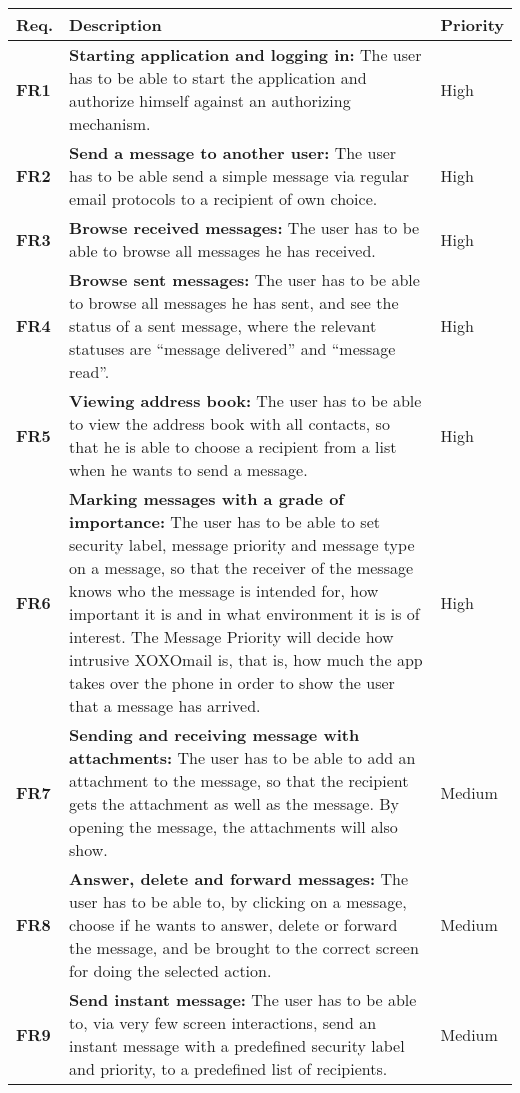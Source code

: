 \begin{table}
\begin{tabular}{p{1.5cm}|p{12.5cm}|p{2cm}} \hline
\textbf{Req.} & \textbf{Description} & \textbf{Priority} \\ \hline \hline
\textbf{FR1} & \textbf{Starting application and logging in:} The user has to be able to start the application and authorize himself against an authorizing mechanism. & High \\ \hline
\textbf{FR2} & \textbf{Send a message to another user:} The user has to be able send a simple message via regular email protocols to a recipient of own choice. & High \\ \hline
\textbf{FR3} & \textbf{Browse received messages:} The user has to be able to browse all messages he has received. & High \\ \hline
\textbf{FR4} & \textbf{Browse sent messages:} The user has to be able to browse all messages he has sent, and see the status of a sent message, where the relevant statuses are “message delivered” and “message read”. & High \\ \hline
\textbf{FR5} & \textbf{Viewing address book:} The user has to be able to view the address book with all contacts, so that he is able to choose a recipient from a list when he wants to send a message. & High \\ \hline
\textbf{FR6} & \textbf{Marking messages with a grade of importance:} The user has to be able to set security label, message priority and message type on a message, so that the receiver of the message knows who the message is intended for, how important it is and in what environment it is is of interest. The Message Priority will decide how intrusive XOXOmail is, that is, how much the app takes over the phone in order to show the user that a message has arrived.  & High \\ \hline
\textbf{FR7} & \textbf{Sending and receiving message with attachments:} The user has to be able to add an attachment to the message, so that the recipient gets the attachment as well as the message. By opening the message, the attachments will also show. & Medium \\ \hline
\textbf{FR8} & \textbf{Answer, delete and forward messages:} The user has to be able to, by clicking on a message, choose if he wants to answer, delete or forward the message, and be brought to the correct screen for doing the selected action. & Medium \\ \hline
\textbf{FR9} & \textbf{Send instant message:} The user has to be able to, via very few screen interactions, send an instant message with a predefined security label and priority, to a predefined list of recipients. & Medium \\ \hline

\end{tabular}
\end{table}
